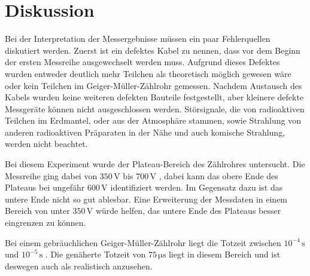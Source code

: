 \section{Diskussion}
\label{sec:Diskussion}

Bei der Interpretation der Messergebnisse müssen ein paar Fehlerquellen diskutiert werden.
Zuerst ist ein defektes Kabel zu nennen, dass vor dem Beginn der ersten Messreihe ausgewechselt werden muss. Aufgrund dieses Defektes wurden entweder deutlich mehr Teilchen als theoretisch möglich gewesen wäre oder kein Teilchen im Geiger-Müller-Zählrohr gemessen.
Nachdem Austausch des Kabels wurden keine weiteren defekten Bauteile festgestellt, aber kleinere defekte Messgeräte können nicht ausgeschlossen werden.
Störsignale, die von radioaktiven Teilchen im Erdmantel, oder aus der Atmosphäre stammen, sowie Strahlung von anderen radioaktiven Präparaten in der Nähe und auch komische Strahlung, werden nicht beachtet.

Bei diesem Experiment wurde der Plateau-Bereich des Zählrohres untersucht. Die Messreihe ging dabei von $350 \,\unit{\volt}$ bis $700 \,\unit{\volt}$ , dabei kann das obere Ende des Plateaus bei ungefähr $600 \, \unit{\volt}$ identifiziert werden.
Im Gegensatz dazu ist das untere Ende nicht so gut ablesbar. Eine Erweiterung der Messdaten in einem Bereich von unter $350 \, \unit{\volt}$ würde helfen, das untere Ende des Plateaus besser eingrenzen zu können.

Bei einem gebräuchlichen Geiger-Müller-Zählrohr liegt die Totzeit zwischen $10^{-4} \, \unit{\second}$ und $10^{-5} \, \unit{\second}$ \cite{ap01}. Die genäherte Totzeit von $ 75 \,\unit{\micro\second}$ liegt in diesem Bereich und ist deswegen auch als realistisch anzusehen.